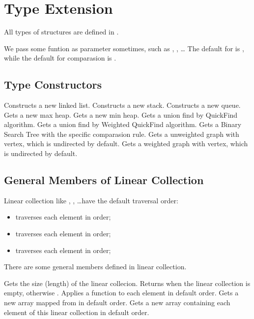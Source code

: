 \section{Type Extension}
All types of structures are defined in .

We pass some funtion as parameter sometimes, such as , ,  \ldots 
The default  for  is , while the default for comparasion is .

\subsection{Type Constructors}
Constructs a new linked list.
Constructs a new stack.
Constructs a new queue.
Gets a new max heap.
Gets a new min heap.
Gets a union find by QuickFind algorithm.
Gets a union find by Weighted QuickFind algorithm.
Gets a Binary Search Tree with the specific comparasion rule.
Gets a unweighted graph with  vertex, which is undirected by default.
Gets a weighted graph with  vertex, which is undirected by default.

\subsection{General Members of Linear Collection}
Linear collection like , ,  \ldots have the default traversal order:

\begin{itemize}
  \item {} traverses each element in  order;
  \item {} traverses each element in  order;
  \item {} traverses each element in  order;
\end{itemize}

There are some general members defined in linear collection. 

Gets the size (length) of the linear collecion.
Returns  when the linear collection is empty, otherwise .
Applies a function to each element in default order.
Gets a new array mapped from  in default order.
Gets a new array containing each element of this linear collection in default order.


